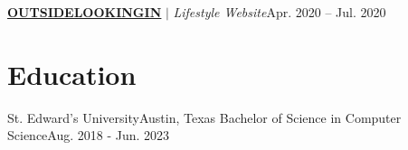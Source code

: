 \documentclass[letterpaper,11pt]{article}
\newif\ifmobile
\begin{document}
        \resumeProjectHeading
          {\href{https://erikb.dev/showcase/outsidelookingin}{\underline{\textbf{OUTSIDELOOKINGIN}}} $|$ \emph{Lifestyle Website}}{Apr. 2020 -- Jul. 2020}
          \resumeItemListStart
          \resumeItemListEnd
      \fi

      \ifmobile
        \resumeProjectHeading
          {\href{https://github.com/erikbdev/PrismUI}{\underline{\textbf{PrismUI}}} $|$ \emph{AppKit, SwiftUI, Objective-C, C++}}{Sep. 2019 -- Jun. 2022}
          \resumeItemListStart
            \resumeItem{Designed and developed macOS application that interacts with HID USB to modify keyboard lighting.}
            \resumeItem{Utilized Apple's native libraries to establish intercommunication between hardware and software.}
            \resumeItem{Transitioned from Objective-C to Swift and SwiftUI, reducing error-prone code and increase maintainability.} 
          \resumeItemListEnd

      \fi

    \resumeSubHeadingListEnd

\section{Education}
  \resumeSubHeadingListStart
    \resumeSubheading
      {St. Edward's University}{Austin, Texas}
      {Bachelor of Science in Computer Science}{Aug. 2018 - Jun. 2023}
        \resumeItemListStart
         \resumeItemListEnd

  \resumeSubHeadingListEnd

\end{document}
